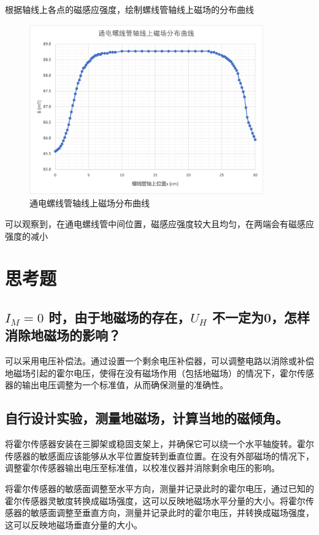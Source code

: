 \documentclass{article}
\begin{document}
根据轴线上各点的磁感应强度，绘制螺线管轴线上磁场的分布曲线

\begin{figure}[htbp]
    \centering
    \includegraphics[width=0.9\textwidth]{B_plot.png}
    \caption{通电螺线管轴线上磁场分布曲线}
\end{figure}

可以观察到，在通电螺线管中间位置，磁感应强度较大且均匀，在两端会有磁感应强度的减小

\newpage

\section{思考题}
\subsection{$I_M=0$ 时，由于地磁场的存在，$U_H$ 不一定为0，怎样消除地磁场的影响？}
可以采用电压补偿法。通过设置一个剩余电压补偿器，可以调整电路以消除或补偿地磁场引起的霍尔电压，使得在没有磁场作用（包括地磁场）的情况下，霍尔传感器的输出电压调整为一个标准值，从而确保测量的准确性。

\subsection{自行设计实验，测量地磁场，计算当地的磁倾角。}
将霍尔传感器安装在三脚架或稳固支架上，并确保它可以绕一个水平轴旋转。霍尔传感器的敏感面应该能够从水平位置旋转到垂直位置。在没有外部磁场的情况下，调整霍尔传感器输出电压至标准值，以校准仪器并消除剩余电压的影响。

将霍尔传感器的敏感面调整至水平方向，测量并记录此时的霍尔电压，通过已知的霍尔传感器灵敏度转换成磁场强度，这可以反映地磁场水平分量的大小。将霍尔传感器的敏感面调整至垂直方向，测量并记录此时的霍尔电压，并转换成磁场强度，这可以反映地磁场垂直分量的大小。
\end{document}
